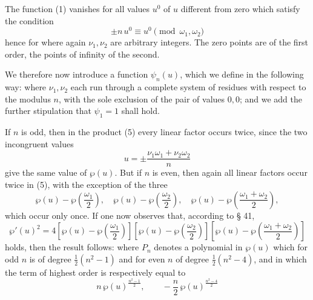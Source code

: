
The function (1) vanishes for all values $u^0$ of $u$ different from zero
which satisfy the condition
\[
\pm n\,u^0 \equiv u^0 \pmod{\omega_1,\omega_2}
\]
hence for
where again $\nu_1, \nu_2$ are arbitrary integers. The zero points are of
the first order, the points of infinity of the second.

We therefore now introduce a function $\psi_n(u)$, which we define in the
following way:
where $\nu_1, \nu_2$ each run through a complete system of residues with
respect to the modulus $n$, with the sole exclusion of the pair of values
$0,0$; and we add the further stipulation that $\psi_1 = 1$ shall hold.

If $n$ is odd, then in the product (5) every linear factor occurs twice,
since the two incongruent values
\[
u = \pm\frac{\nu_1\omega_1 + \nu_2\omega_2}{n}
\]
give the same value of $\wp(u)$. But if $n$ is even, then again all linear
factors occur twice in (5), with the exception of the three
\[
\wp(u) - \wp\left(\frac{\omega_1}{2}\right),\quad
\wp(u) - \wp\left(\frac{\omega_2}{2}\right),\quad
\wp(u) - \wp\left(\frac{\omega_1+\omega_2}{2}\right),
\]
which occur only once. If one now observes that, according to § 41,
\[
\wp'(u)^2 = 4\left[\wp(u)-\wp\left(\frac{\omega_1}{2}\right)\right]\left[\wp(u)-\wp\left(\frac{\omega_2}{2}\right)\right]\left[\wp(u)-\wp\left(\frac{\omega_1+\omega_2}{2}\right)\right]
\]
holds, then the result follows:
where $P_n$ denotes a polynomial in $\wp(u)$ which for
odd $n$ is of degree $\frac12(n^2-1)$ and for even $n$ of degree
$\frac12(n^2-4)$, and in which the term of highest order is respectively
equal to
\[
n\,\wp(u)^{\frac{n^2-1}{2}},\qquad -\frac{n}{2}\,\wp(u)^{\frac{n^2-4}{2}}
\]
